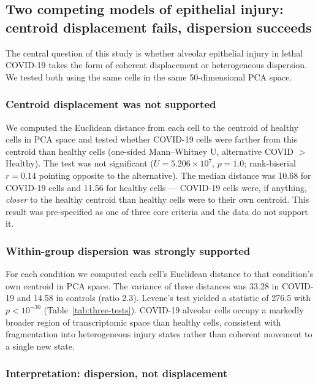 \documentclass[11pt,a4paper]{article}
\begin{document}
\subsection{Two competing models of epithelial injury: centroid displacement fails, dispersion succeeds}

The central question of this study is whether alveolar epithelial injury in
lethal COVID-19 takes the form of coherent displacement or heterogeneous
dispersion. We tested both using the same cells in the same 50-dimensional PCA
space.

\subsubsection{Centroid displacement was not supported}

We computed the Euclidean distance from each cell to the centroid of healthy cells
in PCA space and tested whether COVID-19 cells were farther from this centroid
than healthy cells (one-sided Mann--Whitney U, alternative COVID $>$ Healthy). The
test was not significant ($U = 5.206 \times 10^{7}$, $p = 1.0$; rank-biserial
$r = 0.14$ pointing opposite to the alternative). The median distance was 10.68
for COVID-19 cells and 11.56 for healthy cells --- COVID-19 cells were, if
anything, \textit{closer} to the healthy centroid than healthy cells were to their own
centroid. This result was pre-specified as one of three core criteria and the data
do not support it.

\subsubsection{Within-group dispersion was strongly supported}

For each condition we computed each cell's Euclidean distance to that condition's
own centroid in PCA space. The variance of these distances was 33.28 in COVID-19
and 14.58 in controls (ratio 2.3). Levene's test yielded a statistic of 276.5
with $p < 10^{-30}$ (Table~\ref{tab:three-tests}). COVID-19 alveolar cells occupy a markedly broader
region of transcriptomic space than healthy cells, consistent with fragmentation
into heterogeneous injury states rather than coherent movement to a single new
state.

\subsubsection{Interpretation: dispersion, not displacement}
\end{document}
